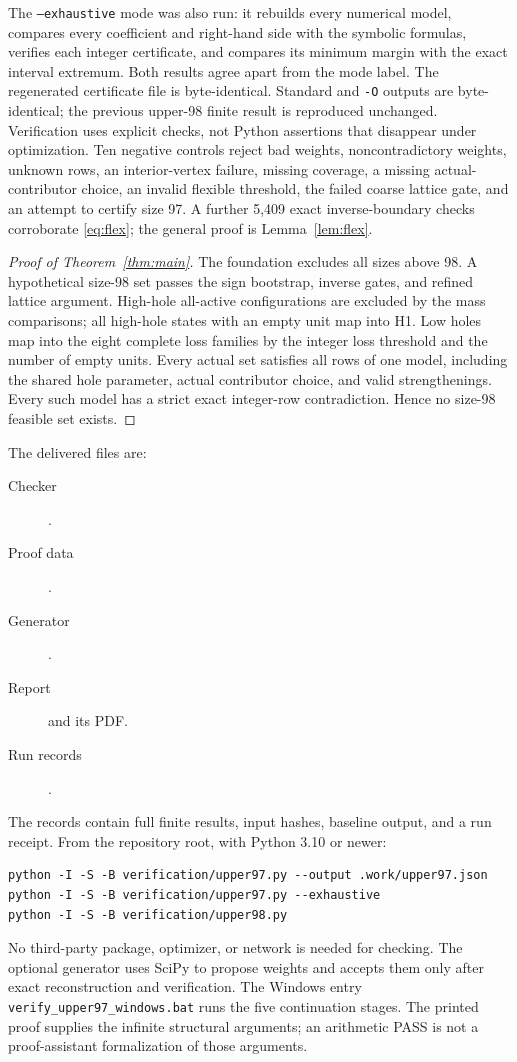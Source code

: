 \documentclass[11pt,a4paper]{article}
\begin{document}
The \texttt{--exhaustive} mode was also run: it rebuilds every numerical
model, compares every coefficient and right-hand side with the symbolic
formulas, verifies each integer certificate, and compares its minimum
margin with the exact interval extremum. Both results agree apart from
the mode label. The regenerated certificate file is byte-identical.
Standard and \texttt{-O} outputs are byte-identical;
the previous upper-98 finite result is reproduced unchanged. Verification
uses explicit checks, not Python assertions that disappear under
optimization. Ten negative controls reject bad weights, noncontradictory
weights, unknown rows, an interior-vertex failure, missing coverage,
a missing actual-contributor choice, an invalid flexible threshold,
the failed coarse lattice gate, and an attempt to certify size 97.
A further 5,409 exact inverse-boundary checks corroborate
\eqref{eq:flex}; the general proof is Lemma~\ref{lem:flex}.

\begin{proof}[Proof of Theorem~\ref{thm:main}]
The foundation excludes all sizes above 98. A hypothetical size-98 set
passes the sign bootstrap, inverse gates, and refined lattice argument.
High-hole all-active configurations are excluded by the mass comparisons;
all high-hole states with an empty unit map into H1. Low holes map into
the eight complete loss families by the integer loss threshold and the
number of empty units. Every actual set satisfies all rows of one model,
including the shared hole parameter, actual contributor choice, and
valid strengthenings. Every such model has a strict exact integer-row
contradiction. Hence no size-98 feasible set exists.
\end{proof}

\clearpage
The delivered files are:
\begin{description}
\item[Checker] .
\item[Proof data] .
\item[Generator] .
\item[Report]  and its PDF.
\item[Run records] .
\end{description}
The records contain full finite results, input hashes, baseline output,
and a run receipt.
From the repository root, with Python 3.10 or newer:
\begin{verbatim}
python -I -S -B verification/upper97.py --output .work/upper97.json
python -I -S -B verification/upper97.py --exhaustive
python -I -S -B verification/upper98.py
\end{verbatim}
No third-party package, optimizer, or network is needed for checking.
The optional generator uses SciPy to propose weights and accepts them
only after exact reconstruction and verification. The Windows entry
\texttt{verify\_upper97\_windows.bat} runs the five continuation stages.
The printed proof supplies the infinite structural arguments; an
arithmetic PASS is not a proof-assistant formalization of those arguments.
\end{document}
